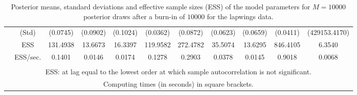 {{\begin{table}
\begin{tabular}{cc ccc ccc ccc}
 & (Std) 
 & (0.0745)  & (0.0902)  & (0.1024)  & (0.0362)  & (0.0872)  & (0.0623)  & (0.0659)  & (0.0411)  & (429153.4170)  \\  [0.75ex] 
 & ESS 
 & 131.4938  & 13.6673  & 16.3397  & 119.9582  & 272.4782  & 35.5074  & 13.6295  & 846.4105  & 6.3540  \\  [0.75ex] 
[938.55 s]  & ESS/sec. 
 & 0.1401  & 0.0146  & 0.0174  & 0.1278  & 0.2903  & 0.0378  & 0.0145  & 0.9018  & 0.0068  \\  [1.3ex] 
 \\  \hline 
\multicolumn{11}{p{11cm}}{\footnotesize{ESS: at lag equal to the lowest order at which sample autocorrelation is not significant.}}  \\ 
\multicolumn{11}{p{11cm}}{\footnotesize{Computing times  (in seconds) in square brackets.}}  \\ 
\end{tabular}
 \caption{Posterior means, standard deviations and effective sample sizes (ESS) of the model parameters for $M=10000$ posterior draws after a burn-in of $10000$ for the lapwings data.}
\label{tab:BKM_theta_2}  
\end{table}
}} \normalsize